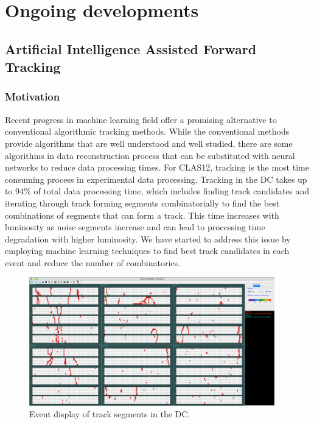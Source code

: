 \section{Ongoing developments}

\subsection{Artificial Intelligence Assisted Forward Tracking}
\subsubsection{Motivation}
Recent progress in machine learning field offer a promising alternative to conventional
algorithmic tracking methods. While the conventional
methods provide algorithms that are well understood and well studied, there are some algorithms
in data reconstruction process that can be substituted with neural networks to reduce data
processing times. For CLAS12, tracking is the most time consuming process in experimental data processing.
Tracking in the DC takes up to 94\% of total data processing time, which includes finding
track candidates and iterating through track forming segments combinatorially to find the best
combinations of segments that can form a track. This time increases with luminosity as noise
segments increase and can lead to processing time degradation with higher luminosity. We have started 
to address this issue by employing machine learning techniques to find best track candidates in
each event and reduce the number of combinatorics.
\begin{figure}
\centering
\includegraphics[width=0.95\textwidth]{pics/nn1.png}
\caption{Event display of track segments in the DC. 
}
\label{fig:nn1}
\end{figure}
